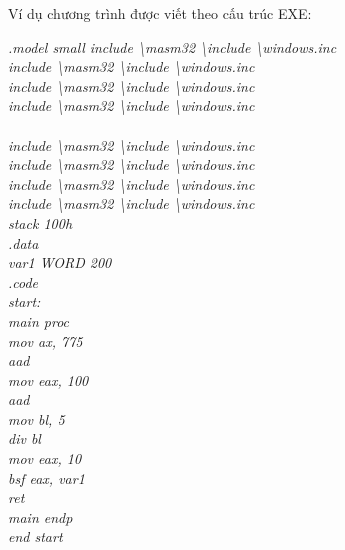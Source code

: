 Ví dụ chương trình được viết theo cấu trúc EXE:\\
	\begin{normalsize}
			\setlength{\parindent}{1cm}		
			\renewcommand{\rmdefault}{cmss}
				\textit {.model small}
     			\textit { include \textbackslash masm32 \textbackslash include \textbackslash windows.inc}  \\  
				\textit { include \textbackslash masm32 \textbackslash include \textbackslash windows.inc} \\
				\textit { include \textbackslash masm32 \textbackslash include \textbackslash windows.inc} \\
				\textit { include \textbackslash masm32 \textbackslash include \textbackslash windows.inc} \\ \\
				\textit { include \textbackslash masm32 \textbackslash include \textbackslash windows.inc} \\ 
				\textit { include \textbackslash masm32 \textbackslash include \textbackslash windows.inc} \\
				\textit { include \textbackslash masm32 \textbackslash include \textbackslash windows.inc} \\
				\textit { include \textbackslash masm32 \textbackslash include \textbackslash windows.inc} \\
				\textit {stack 100h}\\
				\textit {.data}\\
				\textit {var1 WORD  200}\\
				\textit {.code}\\
				\textit {start: }\\
    			\textit {main proc}\\
        		\textit {mov ax, 775}\\
       			 \textit {aad   }\\
        		\textit {	mov eax, 100 }\\
       			\textit { aad}\\
        		\textit {	mov bl, 5}\\
        		\textit {	div bl   }\\
				\textit {mov eax, 10}\\
   				\textit {bsf eax, var1}		\\
		  		\textit {ret}\\
     			\textit {main endp}\\
				\textit {end start}\\
	\end{normalsize}
	

